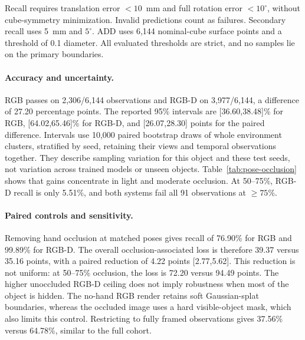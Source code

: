 Recall requires translation error $<10$~mm and full rotation error $<10^\circ$, without cube-symmetry minimization. Invalid predictions count as failures. Secondary recall uses 5~mm and $5^\circ$. ADD uses 6,144 nominal-cube surface points and a threshold of 0.1 diameter. All evaluated thresholds are strict, and no samples lie on the primary boundaries.

\begin{table}[t]
\centering\small

\caption{Independent pose recall (\%) under hand occlusion. All frames remain in the denominator, including invalid predictions. Occlusion is associated with viewpoint in this sampling design.}
\label{tab:pose-occlusion}
\end{table}

\paragraph{Accuracy and uncertainty.}
RGB passes on 2,306/6,144 observations and RGB-D on 3,977/6,144, a difference of 27.20 percentage points. The reported 95\% intervals are [36.60,38.48]\% for RGB, [64.02,65.46]\% for RGB-D, and [26.07,28.30] points for the paired difference. Intervals use 10,000 paired bootstrap draws of whole environment clusters, stratified by seed, retaining their views and temporal observations together. They describe sampling variation for this object and these test seeds, not variation across trained models or unseen objects. Table~\ref{tab:pose-occlusion} shows that gains concentrate in light and moderate occlusion. At 50--75\%, RGB-D recall is only 5.51\%, and both systems fail all 91 observations at $\geq75\%$.

\begin{table}[t]
\centering\small

\caption{Secondary pose metrics. All recall denominators include invalid predictions. $^{*}$Mean errors use valid predictions only and must be interpreted with the invalid counts. Threshold comparisons are strict.}
\label{tab:pose-metrics}
\end{table}

\paragraph{Paired controls and sensitivity.}
Removing hand occlusion at matched poses gives recall of 76.90\% for RGB and 99.89\% for RGB-D. The overall occlusion-associated loss is therefore 39.37 versus 35.16 points, with a paired reduction of 4.22 points [2.77,5.62]. This reduction is not uniform: at 50--75\% occlusion, the loss is 72.20 versus 94.49 points. The higher unoccluded RGB-D ceiling does not imply robustness when most of the object is hidden. The no-hand RGB render retains soft Gaussian-splat boundaries, whereas the occluded image uses a hard visible-object mask, which also limits this control. Restricting to fully framed observations gives 37.56\% versus 64.78\%, similar to the full cohort.

